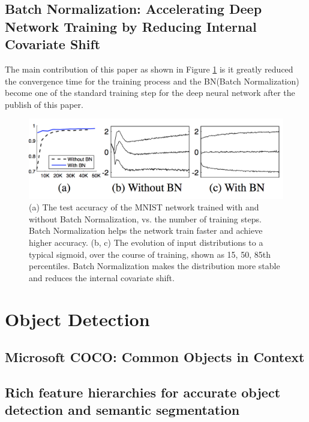 \documentclass[a4paper,12pt]{article}
\begin{document}




\subsection{Batch Normalization: Accelerating Deep Network Training by Reducing
               Internal Covariate Shift\cite{DBLP:journals/corr/IoffeS15}}
The main contribution of this paper as shown in Figure \ref{fig:bp} is it greatly reduced the convergence time for the training process and the BN(Batch Normalization) become one of the standard training step for the deep neural network after the publish of this paper.\\
\begin{figure}[H]
  \begin{center}
      \includegraphics[scale=0.6]{bn.png}
\end{center}
\caption{(a) The test accuracy of the MNIST network trained with and without Batch Normalization, vs. the number of training steps. Batch Normalization helps the network train faster and achieve higher accuracy\cite{DBLP:journals/corr/IoffeS15}. (b, c) The evolution of input distributions to a typical sigmoid, over the course of training, shown as  15, 50, 85th percentiles. Batch Normalization makes the distribution more stable and reduces the internal covariate shift\cite{DBLP:journals/corr/IoffeS15}.}
 \label{fig:bp}
 \end{figure}

 
\section{Object Detection}

\subsection{Microsoft COCO: Common Objects in Context \cite{DBLP:journals/corr/LinMBHPRDZ14} }
\subsection{Rich feature hierarchies for accurate object detection and semantic
               segmentation\cite{DBLP:journals/corr/GirshickDDM13}}
\end{document}
